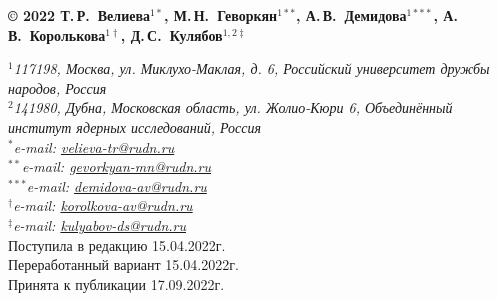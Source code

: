 \begin{center}
  \textbf{%
    \copyright{} 2022
    Т.\,Р.~Велиева$^{1*}$,
    М.\,Н.~Геворкян$^{1**}$,
    А.\,В.~Демидова$^{1***}$,
    А.\,В.~Королькова$^{1\dagger}$,
    Д.\,С.~Кулябов$^{1,2\ddagger}$} 
\end{center}
\begin{center}\small
{\em $^{1}$117198, Москва, ул. Миклухо-Маклая, д. 6, Российский
  университет дружбы народов, Россия\\
$^{2}$141980, Дубна, Московская область, ул. Жолио-Кюри 6,
Объединённый институт ядерных исследований, Россия}\\
\textit{
  $^{*}$e-mail: \url{velieva-tr@rudn.ru}\\
  $^{**}$e-mail: \url{gevorkyan-mn@rudn.ru}\\
  $^{***}$e-mail: \url{demidova-av@rudn.ru}\\
  $^{\dagger}$e-mail: \url{korolkova-av@rudn.ru}\\
  $^{\ddagger}$e-mail: \url{kulyabov-ds@rudn.ru}}\\
Поступила в редакцию 15.04.2022г.\\
Переработанный вариант 15.04.2022г.\\
Принята к публикации 17.09.2022г.
\end{center}

